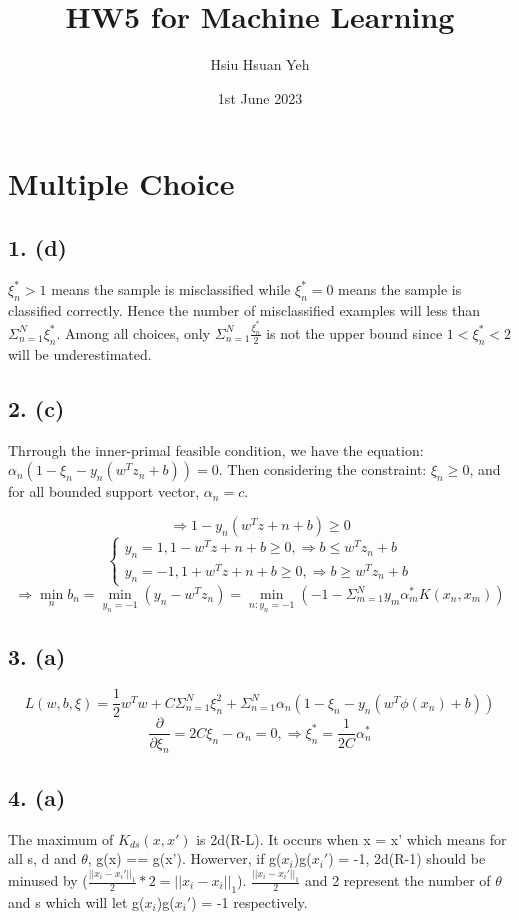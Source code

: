 \documentclass[12pt,a4paper]{article}
\title{ HW5 for Machine Learning }
\author{ Hsiu Hsuan Yeh }
\date{ 1st June 2023 }
\begin{document}
\maketitle

\section{Multiple Choice}
\subsection{1. (d)}
$\xi^{\ast}_n > 1$ means the sample is misclassified while $\xi^{\ast}_n = 0$  means the sample is classified correctly. Hence the number of misclassified examples will less than $\Sigma_{n=1}^N  \xi^{\ast}_n$. Among all choices, only  $\Sigma_{n=1}^N \frac{\xi^{\ast}_n}{2}$ is not the upper bound since $1 < \xi^{\ast}_n < 2$ will be underestimated.

\subsection{2. (c)}
Thrrough the inner-primal feasible condition, we have the equation:  $\alpha_n( 1-\xi_n-y_n(w^Tz_n+b) ) = 0$. Then considering the constraint: $\xi_n \ge 0$, and  for all bounded support vector, $\alpha_n = c$. 

\[
\Rightarrow 
    1 - y_n(w^Tz+n+b) \ge 0
\]
\[
\begin{cases}
    y_n = 1, 1-w^Tz+n+b \ge 0, \Rightarrow b \le w^Tz_n+b \\ 
    y_n = -1, 1+w^Tz+n+b \ge 0, \Rightarrow b \ge w^Tz_n+b
\end{cases}
\]
\[
\Rightarrow \min_n b_n = \min_{y_n=-1} (y_n-w^Tz_n) = \min_{n: y_n=-1} (-1-\Sigma_{m=1}^N y_m\alpha_m^\ast K(x_n, x_m))
\]
\subsection{3. (a)}
\[
L(w, b, \xi) = \frac{1}{2}w^Tw + C\Sigma_{n=1}^N \xi_n^2 + 
\Sigma_{n=1}^N  \alpha_n(1-\xi_n-y_n(w^T\phi(x_n)+b))
\]
\[
\frac{\partial}{\partial \xi_n} = 2C\xi_n - \alpha_n = 0, \Rightarrow \xi^{\ast}_n = \frac{1}{2C}\alpha^{\ast}_n
\]
\subsection{4. (a)}
The maximum of $K_{ds}(x, x')$ is 2d(R-L). It occurs when x = x' which means for all s, d and $\theta$, g(x) == g(x'). Howerver, if g($x_i$)g($x_i'$) = -1, 2d(R-1) should be minused by ($\frac{||x_i - x_i'||_1}{2} * 2 = ||x_i - x_i||_1$). $\frac{||x_i - x_i'||_1}{2}$ and 2 represent the number of $\theta$ and s which will let g($x_i$)g($x_i'$) = -1 respectively. 
\end{document}
